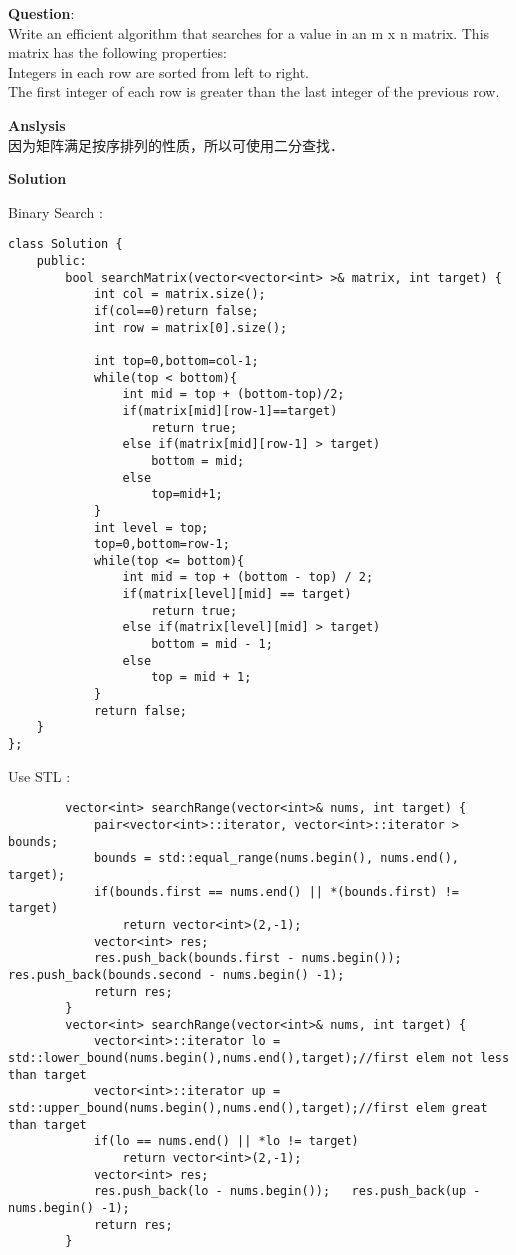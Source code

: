     
\begin{description}
    \item{\textbf{Question}}:\\%
		Write an efficient algorithm that searches for a value in an m x n matrix. This matrix has the following properties:\\
		Integers in each row are sorted from left to right.\\
		The first integer of each row is greater than the last integer of the previous row.\\

    \item{\textbf{Anslysis}}\\
		因为矩阵满足按序排列的性质，所以可使用二分查找．\\

    \item{\textbf{Solution}}\\
	\item{Binary Search} : \\
		\begin{lstlisting}
class Solution {
	public:
		bool searchMatrix(vector<vector<int> >& matrix, int target) {
			int col = matrix.size();
			if(col==0)return false;
			int row = matrix[0].size();

			int top=0,bottom=col-1;
			while(top < bottom){
				int mid = top + (bottom-top)/2;
				if(matrix[mid][row-1]==target)	
					return true;
				else if(matrix[mid][row-1] > target)	
					bottom = mid;
				else	
					top=mid+1;
			}
			int level = top;
			top=0,bottom=row-1;
			while(top <= bottom){
				int mid = top + (bottom - top) / 2;
				if(matrix[level][mid] == target)
					return true;
				else if(matrix[level][mid] > target)
					bottom = mid - 1;
				else 
					top = mid + 1;
			}
			return false;
	}
};
		\end{lstlisting}
	\item{Use STL} : \\
		\begin{lstlisting}
		vector<int> searchRange(vector<int>& nums, int target) {
			pair<vector<int>::iterator, vector<int>::iterator > bounds;
			bounds = std::equal_range(nums.begin(), nums.end(), target);
			if(bounds.first == nums.end() || *(bounds.first) != target)
				return vector<int>(2,-1);
			vector<int> res;
			res.push_back(bounds.first - nums.begin());	res.push_back(bounds.second - nums.begin() -1);
			return res;
		}
		vector<int> searchRange(vector<int>& nums, int target) {
			vector<int>::iterator lo = std::lower_bound(nums.begin(),nums.end(),target);//first elem not less than target
			vector<int>::iterator up = std::upper_bound(nums.begin(),nums.end(),target);//first elem great than target
			if(lo == nums.end() || *lo != target)
				return vector<int>(2,-1);
			vector<int> res;
			res.push_back(lo - nums.begin());	res.push_back(up - nums.begin() -1);
			return res;
		}
		\end{lstlisting}
\end{description}

